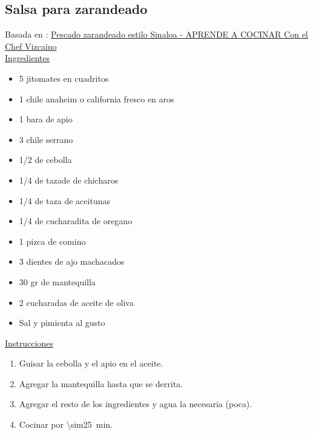 \subsection{Salsa para zarandeado}
\label{salsa-zarandeado}

Basada en : \href{https://aprendeacocinarfacil.wordpress.com/2012/03/13/pescado-sarandeado-estilo-sinaloa-aya-pinchi/}{Pescado zarandeado estilo Sinaloa - APRENDE A COCINAR Con el Chef Vizcaino} \\

\underline{Ingredientes}
\begin{itemize}
\item 5 jitomates en cuadritos
\item 1 chile anaheim o california fresco en aros
\item 1 bara de apio
\item 3 chile serrano
\item 1/2 de cebolla
\item 1/4 de tazade de chicharos
\item 1/4 de taza de aceitunas
\item 1/4 de cucharadita de oregano
\item 1 pizca de comino
\item 3 dientes de ajo machacados
\item 30 gr de mantequilla
\item 2 cucharadas de aceite de oliva
\item Sal y pimienta al gusto
\end{itemize}


\underline{Instrucciones}
\begin{enumerate}
\item Guisar la cebolla y el apio en el aceite.
\item Agregar la mantequilla hasta que se derrita.
\item Agregar el resto de los ingredientes y agua la necesaria (poca).
\item Cocinar por \SI{\sim25}{min}.
\end{enumerate}
